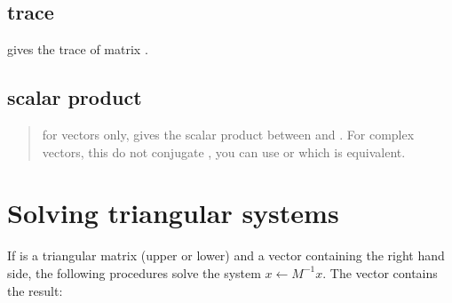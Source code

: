 \documentclass[a4paper,11pt,english]{sphinxmanual}
\begin{document}
\section{trace}
\label{\detokenize{gmm/blas:trace}}
\sphinxAtStartPar
{} gives the trace of matrix .


\section{scalar product}
\label{\detokenize{gmm/blas:scalar-product}}\begin{quote}

\sphinxAtStartPar
for vectors only,  gives the scalar product between  and . For complex vectors, this do not conjugate , you can use  or  which is equivalent.
\end{quote}


\chapter{Solving triangular systems}
\label{\detokenize{gmm/triangular:solving-triangular-systems}}\label{\detokenize{gmm/triangular:gmm-triangular}}\label{\detokenize{gmm/triangular::doc}}
\sphinxAtStartPar
If  is a triangular matrix (upper or lower) and  a vector containing the right hand side, the following procedures solve the system \(x \leftarrow M^{-1}x\). The vector  contains the result:

\begin{sphinxVerbatim}[commandchars=\\\{\}]
   
    
   
    
\end{sphinxVerbatim}
\end{document}
